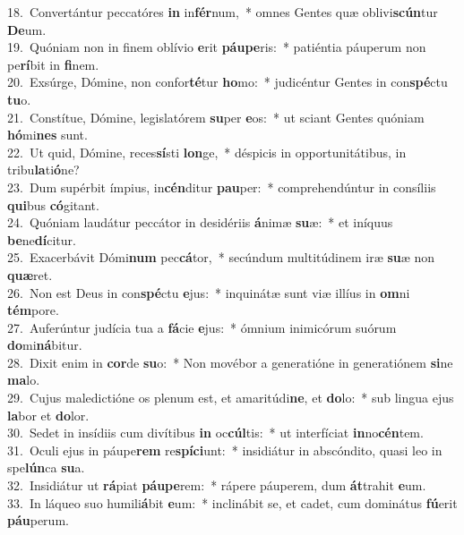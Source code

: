 {18.~}Convertántur peccatóres \textbf{in} in\textbf{fér}num,~* omnes Gentes quæ oblivi\textbf{scún}tur \textbf{De}um.\\
{19.~}Quóniam non in finem oblívio \textbf{e}rit \textbf{páu}\textbf{pe}ris:~* patiéntia páuperum non pe\textbf{rí}bit in \textbf{fi}nem.\\
{20.~}Exsúrge, Dómine, non confor\textbf{té}tur \textbf{ho}mo:~* judicéntur Gentes in con\textbf{spé}ctu \textbf{tu}o.\\
{21.~}Constítue, Dómine, legislatórem \textbf{su}per \textbf{e}os:~* ut sciant Gentes quóniam \textbf{hó}mi\textbf{nes} sunt.\\
{22.~}Ut quid, Dómine, reces\textbf{sí}sti \textbf{lon}ge,~* déspicis in opportunitátibus, in tribu\textbf{la}ti\textbf{ó}ne?\\
{23.~}Dum supérbit ímpius, in\textbf{cén}ditur \textbf{pau}per:~* comprehendúntur in consíliis \textbf{qui}bus \textbf{có}gitant.\\
{24.~}Quóniam laudátur peccátor in desidériis \textbf{á}nimæ \textbf{su}æ:~* et iníquus \textbf{be}ne\textbf{dí}citur.\\
{25.~}Exacerbávit Dómi\textbf{num} pec\textbf{cá}tor,~* secúndum multitúdinem iræ \textbf{su}æ non \textbf{quæ}ret.\\
{26.~}Non est Deus in con\textbf{spé}ctu \textbf{e}jus:~* inquinátæ sunt viæ illíus in \textbf{om}ni \textbf{tém}pore.\\
{27.~}Auferúntur judícia tua a \textbf{fá}cie \textbf{e}jus:~* ómnium inimicórum suórum \textbf{do}mi\textbf{ná}bitur.\\
{28.~}Dixit enim in \textbf{cor}de \textbf{su}o:~* Non movébor a generatióne in generatiónem \textbf{si}ne \textbf{ma}lo.\\
{29.~}Cujus maledictióne os plenum est, et amaritúdi\textbf{ne}, et \textbf{do}lo:~* sub lingua ejus \textbf{la}bor et \textbf{do}lor.\\
{30.~}Sedet in insídiis cum divítibus \textbf{in} oc\textbf{cúl}tis:~* ut interfíciat \textbf{in}no\textbf{cén}tem.\\
{31.~}Oculi ejus in páupe\textbf{rem} re\textbf{spí}\textbf{ci}unt:~* insidiátur in abscóndito, quasi leo in spe\textbf{lún}ca \textbf{su}a.\\
{32.~}Insidiátur ut \textbf{rá}piat \textbf{páu}\textbf{pe}rem:~* rápere páuperem, dum \textbf{át}trahit \textbf{e}um.\\
{33.~}In láqueo suo humili\textbf{á}bit \textbf{e}um:~* inclinábit se, et cadet, cum dominátus \textbf{fú}erit \textbf{páu}perum.\\
